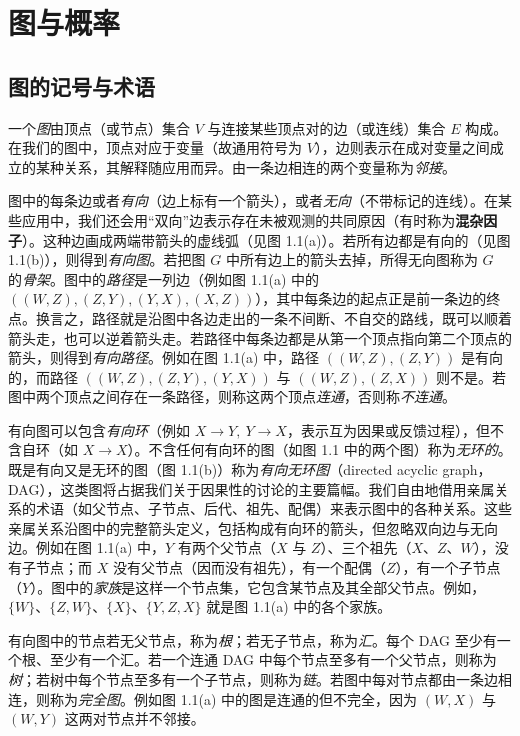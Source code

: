 \section{图与概率}

\subsection{图的记号与术语}

一个\emph{图}由顶点（或节点）集合 $V$ 与连接某些顶点对的边（或连线）集合 $E$ 构成。在我们的图中，顶点对应于变量（故通用符号为 $V$），边则表示在成对变量之间成立的某种关系，其解释随应用而异。由一条边相连的两个变量称为\emph{邻接}。

图中的每条边或者\emph{有向}（边上标有一个箭头），或者\emph{无向}（不带标记的连线）。在某些应用中，我们还会用“双向”边表示存在未被观测的共同原因（有时称为\textbf{混杂因子}）。这种边画成两端带箭头的虚线弧（见图 1.1(a)）。若所有边都是有向的（见图 1.1(b)），则得到\emph{有向图}。若把图 $G$ 中所有边上的箭头去掉，所得无向图称为 $G$ 的\emph{骨架}。图中的\emph{路径}是一列边（例如图 1.1(a) 中的 $((W,Z),(Z,Y),(Y,X),(X,Z))$），其中每条边的起点正是前一条边的终点。换言之，路径就是沿图中各边走出的一条不间断、不自交的路线，既可以顺着箭头走，也可以逆着箭头走。若路径中每条边都是从第一个顶点指向第二个顶点的箭头，则得到\emph{有向路径}。例如在图 1.1(a) 中，路径 $((W,Z),(Z,Y))$ 是有向的，而路径 $((W,Z),(Z,Y),(Y,X))$ 与 $((W,Z),(Z,X))$ 则不是。若图中两个顶点之间存在一条路径，则称这两个顶点\emph{连通}，否则称\emph{不连通}。

有向图可以包含\emph{有向环}（例如 $X\to Y,\ Y\to X$，表示互为因果或反馈过程），但不含自环（如 $X\to X$）。不含任何有向环的图（如图 1.1 中的两个图）称为\emph{无环的}。既是有向又是无环的图（图 1.1(b)）称为\emph{有向无环图}（directed acyclic graph，DAG），这类图将占据我们关于因果性的讨论的主要篇幅。我们自由地借用亲属关系的术语（如父节点、子节点、后代、祖先、配偶）来表示图中的各种关系。这些亲属关系沿图中的完整箭头定义，包括构成有向环的箭头，但忽略双向边与无向边。例如在图 1.1(a) 中，$Y$ 有两个父节点（$X$ 与 $Z$）、三个祖先（$X$、$Z$、$W$），没有子节点；而 $X$ 没有父节点（因而没有祖先），有一个配偶（$Z$），有一个子节点（$Y$）。图中的\emph{家族}是这样一个节点集，它包含某节点及其全部父节点。例如，$\{W\}$、$\{Z,W\}$、$\{X\}$、$\{Y,Z,X\}$ 就是图 1.1(a) 中的各个家族。

有向图中的节点若无父节点，称为\emph{根}；若无子节点，称为\emph{汇}。每个 DAG 至少有一个根、至少有一个汇。若一个连通 DAG 中每个节点至多有一个父节点，则称为\emph{树}；若树中每个节点至多有一个子节点，则称为\emph{链}。若图中每对节点都由一条边相连，则称为\emph{完全图}。例如图 1.1(a) 中的图是连通的但不完全，因为 $(W,X)$ 与 $(W,Y)$ 这两对节点并不邻接。

